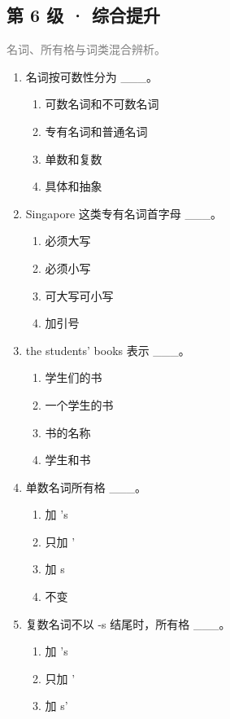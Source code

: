 \documentclass[11pt,a4paper]{ctexart}
\begin{document}
\subsection*{第 6 级 · 综合提升}
\noindent\textcolor{gray}{名词、所有格与词类混合辨析。}\par\smallskip
\begin{enumerate}[leftmargin=*,itemsep=4pt]
\item 名词按可数性分为 \_\_\_。
\begin{enumerate}[label=\Alph*.,leftmargin=2em,itemsep=1pt,topsep=2pt]
\item 可数名词和不可数名词
\item 专有名词和普通名词
\item 单数和复数
\item 具体和抽象
\end{enumerate}
\item Singapore 这类专有名词首字母 \_\_\_。
\begin{enumerate}[label=\Alph*.,leftmargin=2em,itemsep=1pt,topsep=2pt]
\item 必须大写
\item 必须小写
\item 可大写可小写
\item 加引号
\end{enumerate}
\item the students’ books 表示 \_\_\_。
\begin{enumerate}[label=\Alph*.,leftmargin=2em,itemsep=1pt,topsep=2pt]
\item 学生们的书
\item 一个学生的书
\item 书的名称
\item 学生和书
\end{enumerate}
\item 单数名词所有格 \_\_\_。
\begin{enumerate}[label=\Alph*.,leftmargin=2em,itemsep=1pt,topsep=2pt]
\item 加 ’s
\item 只加 ’
\item 加 s
\item 不变
\end{enumerate}
\item 复数名词不以 -s 结尾时，所有格 \_\_\_。
\begin{enumerate}[label=\Alph*.,leftmargin=2em,itemsep=1pt,topsep=2pt]
\item 加 ’s
\item 只加 ’
\item 加 s’

\end{enumerate}
\end{enumerate}
\end{document}
